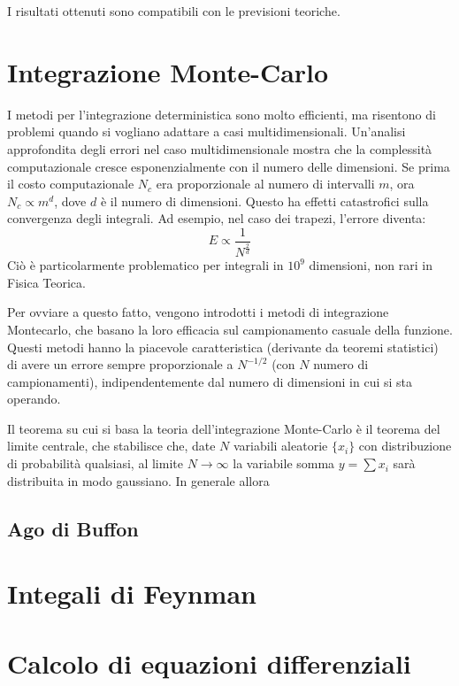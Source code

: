\documentclass[a4paper,10pt]{article}
\begin{document}
I risultati ottenuti sono compatibili con le previsioni teoriche.

\section{Integrazione Monte-Carlo}

I metodi per l'integrazione deterministica sono molto efficienti, ma risentono di problemi quando si vogliano adattare a casi multidimensionali.
Un'analisi approfondita degli errori nel caso multidimensionale mostra che la complessità computazionale cresce esponenzialmente con il numero delle dimensioni. Se prima il costo computazionale $N_c$ era proporzionale al numero di intervalli $m$, ora $N_c \propto m^d$, dove $d$ è il numero di dimensioni. Questo ha effetti catastrofici sulla convergenza degli integrali. Ad esempio, nel caso dei trapezi, l'errore diventa:
$$E\propto\frac{1}{N^{\frac{2}{d}}}$$
Ciò è particolarmente problematico per integrali in $10^9$ dimensioni, non rari in Fisica Teorica.

Per ovviare a questo fatto, vengono introdotti i metodi di integrazione Montecarlo, che basano la loro efficacia sul campionamento casuale della funzione. Questi metodi hanno la piacevole caratteristica (derivante da teoremi statistici) di avere un errore sempre proporzionale a $N^{-1/2}$ (con $N$ numero di campionamenti), indipendentemente dal numero di dimensioni in cui si sta operando.

Il teorema su cui si basa la teoria dell'integrazione Monte-Carlo è il teorema del limite centrale, che stabilisce che, date $N$ variabili aleatorie $\{x_i\}$ con distribuzione di probabilità qualsiasi, al limite $N\to\infty$ la variabile somma $y = \sum x_i$ sarà distribuita in modo gaussiano.
In generale allora

\subsection{Ago di Buffon}

\section{Integali di Feynman}

\section{Calcolo di equazioni differenziali}
\end{document}
